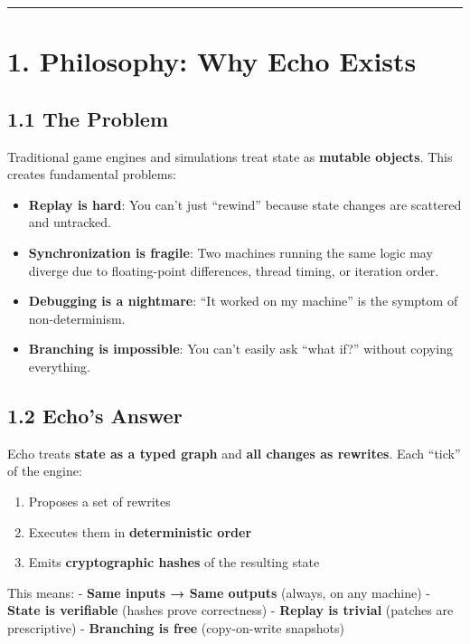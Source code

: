 \documentclass[
]{book}
\providecommand{\tightlist}{%
  \setlength{\itemsep}{0pt}\setlength{\parskip}{0pt}}
\begin{document}
\begin{center}\rule{0.5\linewidth}{0.5pt}\end{center}

\section{1. Philosophy: Why Echo
Exists}\label{philosophy-why-echo-exists}

\subsection{1.1 The Problem}\label{the-problem}

Traditional game engines and simulations treat state as \textbf{mutable
objects}. This creates fundamental problems:

\begin{itemize}
\tightlist
\item
  \textbf{Replay is hard}: You can't just ``rewind'' because state
  changes are scattered and untracked.
\item
  \textbf{Synchronization is fragile}: Two machines running the same
  logic may diverge due to floating-point differences, thread timing, or
  iteration order.
\item
  \textbf{Debugging is a nightmare}: ``It worked on my machine'' is the
  symptom of non-determinism.
\item
  \textbf{Branching is impossible}: You can't easily ask ``what if?''
  without copying everything.
\end{itemize}

\subsection{1.2 Echo's Answer}\label{echos-answer}

Echo treats \textbf{state as a typed graph} and \textbf{all changes as
rewrites}. Each ``tick'' of the engine:

\begin{enumerate}
\def\labelenumi{\arabic{enumi}.}
\tightlist
\item
  Proposes a set of rewrites
\item
  Executes them in \textbf{deterministic order}
\item
  Emits \textbf{cryptographic hashes} of the resulting state
\end{enumerate}

This means: - \textbf{Same inputs → Same outputs} (always, on any
machine) - \textbf{State is verifiable} (hashes prove correctness) -
\textbf{Replay is trivial} (patches are prescriptive) -
\textbf{Branching is free} (copy-on-write snapshots)
\end{document}
